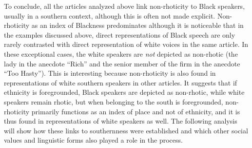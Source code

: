 To conclude, all the articles analyzed above link non-rhoticity to Black speakers, usually in a southern context, although this is often not made explicit. Non-rhoticity as an index of Blackness predominates although it is noticeable that in the examples discussed above, direct representations of Black speech are only rarely contrasted with direct representation of white voices in the same article. In these exceptional cases, the white speakers are \emph{not} depicted as non-rhotic (the lady in the anecdote “Rich” and the senior member of the firm in the anecdote “Too Hasty”). This is interesting because non-rhoticity is also found in representations of white southern speakers in other articles. It suggests that if ethnicity is foregrounded, Black speakers are depicted as non-rhotic, while white speakers remain rhotic, but when belonging to the south is foregrounded, non-rhoticity primarily functions as an index of place and not of ethnicity, and it is thus found in representations of white speakers as well. The following analysis will show how these links to southernness were established and which other social values and linguistic forms also played a role in the process.



